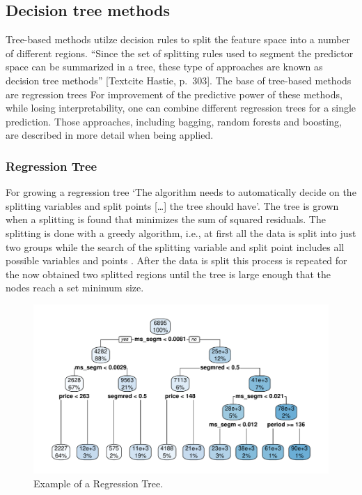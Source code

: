 \documentclass[11pt,]{article}
\begin{document}
\hypertarget{decision-tree-methods}{%
\subsection{Decision tree methods}\label{decision-tree-methods}}

Tree-based methods utilze decision rules to split the feature space into
a number of different regions. ``Since the set of splitting rules used
to segment the predictor space can be summarized in a tree, these type
of approaches are known as decision tree methods'' {[}Textcite Hastie,
p.~303{]}. The base of tree-based methods are regression trees For
improvement of the predictive power of these methods, while losing
interpretability, one can combine different regression trees for a
single prediction. Those approaches, including bagging, random forests
and boosting, are described in more detail when being applied.

\hypertarget{regression-tree}{%
\subsubsection{Regression Tree}\label{regression-tree}}

For growing a regression tree `The algorithm needs to automatically
decide on the splitting variables and split points {[}\ldots{]} the tree
should have'\autocite[p.349]{Hastie2013}. The tree is grown when a
splitting is found that minimizes the sum of squared residuals. The
splitting is done with a greedy algorithm, i.e., at first all the data
is split into just two groups while the search of the splitting variable
and split point includes all possible variables and points
\autocite[cf.~][p.349]{Hastie2013}. After the data is split this process
is repeated for the now obtained two splitted regions until the tree is
large enough that the nodes reach a set minimum size.

\begin{figure}
\centering
\includegraphics{../00_data/output_paper/09_tree.pdf}
\caption{Example of a Regression Tree.}
\end{figure}
\end{document}
